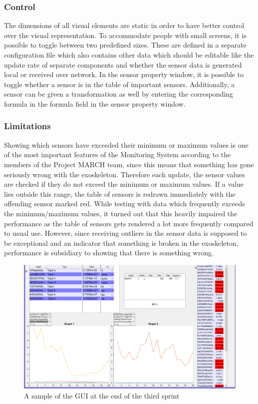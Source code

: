 \subsubsection{Control}
The dimensions of all visual elements are static in order to have better control over the visual representation. To accommodate people with small screens, it is possible to toggle between two predefined sizes. These are defined in a separate configuration file which also contains other data which should be editable like the update rate of separate components and whether the sensor data is generated local or received over network. In the sensor property window, it is possible to toggle whether a sensor is in the table of important sensors. Additionally, a sensor can be given a transformation as well by entering the corresponding formula in the formula field in the sensor property window. 


\subsubsection{Limitations}
Showing which sensors have exceeded their minimum or maximum values is one of the most important features of the Monitoring System according to the members of the Project MARCH team, since this means that something has gone seriously wrong with the exoskeleton. Therefore each update, the sensor values are checked if they do not exceed the minimum or maximum values. If a value lies outside this range, the table of sensors is redrawn immediately with the offending sensor marked red. While testing with data which frequently exceeds the minimum/maximum values, it turned out that this heavily impaired the performance as the table of sensors gets rendered a lot more frequently compared to usual use. However, since receiving outliers in the sensor data is supposed to be exceptional and an indicator that something is broken in the exoskeleton, performance is subsidiary to showing that there is something wrong.


\begin{figure}[H]
	\centering
	\includegraphics[width=.75\textwidth]{images/GUIV2}
	\caption{A sample of the GUI at the end of the third sprint} 
	\label{fig:GUIV2}
\end{figure} 

